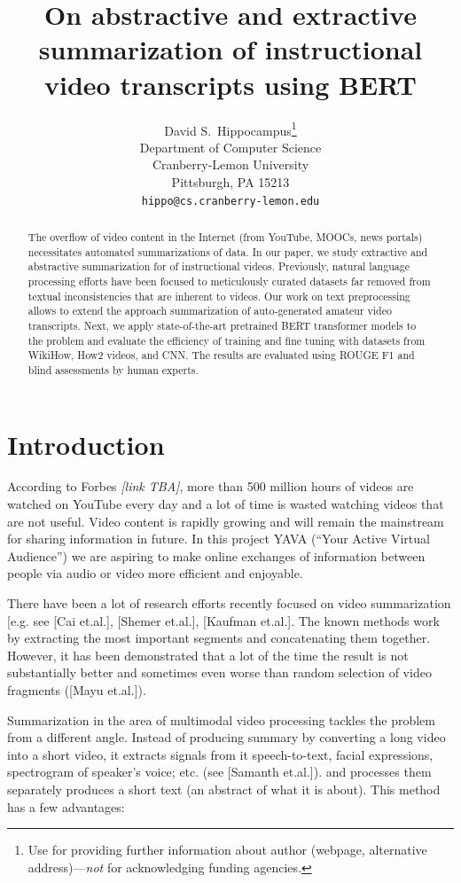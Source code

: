 \documentclass{article}
\title{On abstractive and extractive summarization of instructional video transcripts using BERT}
\author{%
  David S.~Hippocampus\thanks{Use  for providing further information
    about author (webpage, alternative address)---\emph{not} for acknowledging
    funding agencies.} \\
  Department of Computer Science\\
  Cranberry-Lemon University\\
  Pittsburgh, PA 15213 \\
  \texttt{hippo@cs.cranberry-lemon.edu} \\
}
\begin{document}
\maketitle

\begin{abstract}
The overflow of video content in the Internet (from YouTube, MOOCs, news portals) necessitates automated summarizations of data. In our paper, we study extractive and abstractive summarization for of instructional videos. Previously, natural language processing efforts have been focused to meticulously curated datasets far removed from textual inconsistencies that are inherent to videos. Our work on text preprocessing allows to extend the approach summarization of auto-generated amateur video transcripts. Next, we apply state-of-the-art pretrained BERT transformer models to the problem and evaluate the efficiency of training and fine tuning with datasets from WikiHow, How2 videos, and CNN. The results are evaluated using ROUGE F1 and blind assessments by human experts.

\end{abstract}

\section{Introduction}
 
According to Forbes \textit{[link TBA]}, more than 500 million hours of videos are watched on YouTube every day and a lot of time is wasted watching videos that are not useful. Video content is rapidly growing and will remain the mainstream for sharing information in future. In this project YAVA (“Your Active Virtual Audience”) we are aspiring to make online exchanges of information between people via audio or video more efficient and enjoyable. 

There have been a lot of research efforts recently focused on video summarization [e.g. see [Cai et.al.], [Shemer et.al.], [Kaufman et.al.]. The known methods work by extracting the most important segments and concatenating them together. However, it has been demonstrated that a lot of the time the result is not substantially better and sometimes even worse than random selection of video fragments ([Mayu et.al.]). 

Summarization in the area of multimodal video processing tackles the problem from a different angle. Instead of producing summary by converting a long video into a short video, it extracts signals from it speech-to-text, facial expressions, spectrogram of speaker’s voice; etc. (see [Samanth et.al.]). and processes them separately produces a short text (an abstract of what it is about). This method has a few advantages:
\end{document}

